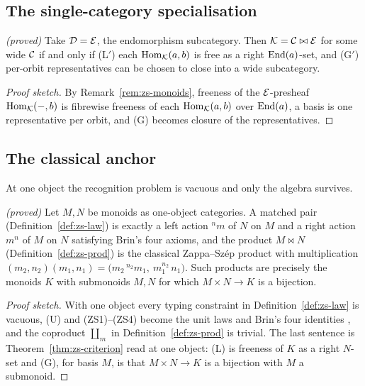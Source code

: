 \subsection*{The single-category specialisation}\label{sec:zs-single}

\begin{corollary}\label{cor:zs-single}
\emph{(proved)}\;
Take $\mathcal{D}=\mathcal{E}$, the endomorphism subcategory. Then $\mathcal{K}=\mathcal{C}\bowtie\mathcal{E}$ for some wide
$\mathcal{C}$ if and only if \textnormal{(L$'$)} each $\mathrm{Hom}_{\mathcal{K}}(a,b)$ is free as a right
$\mathrm{End}(a)$-set, and \textnormal{(G$'$)} per-orbit representatives can be chosen to
close into a wide subcategory.
\end{corollary}

\begin{proof}[Proof sketch]
By Remark~\ref{rem:zs-monoids}, freeness of the $\mathcal{E}$-presheaf $\mathrm{Hom}_{\mathcal{K}}(-,b)$ is
fibrewise freeness of each $\mathrm{Hom}_{\mathcal{K}}(a,b)$ over $\mathrm{End}(a)$, a basis is one
representative per orbit, and (G) becomes closure of the representatives.
\end{proof}

\subsection*{The classical anchor}\label{sec:zs-monoid}

At one object the recognition problem is vacuous and only the algebra survives.

\begin{proposition}\label{prop:zs-monoid}
\emph{(proved)}\;
Let $M,N$ be monoids as one-object categories. A matched pair
(Definition~\ref{def:zs-law}) is exactly a left action ${}^{n}m$ of $N$ on $M$ and
a right action $m^{n}$ of $M$ on $N$ satisfying Brin's four axioms, and the product
$M\bowtie N$ (Definition~\ref{def:zs-prod}) is the classical Zappa--Sz\'ep product
with multiplication $(m_2,n_2)(m_1,n_1)=\bigl(m_2\,{}^{n_2}m_1,\ m_1^{n_2}\,n_1
\bigr)$. Such products are precisely the monoids $K$ with submonoids $M,N$ for which
$M\times N\to K$ is a bijection.
\end{proposition}

\begin{proof}[Proof sketch]
With one object every typing constraint in Definition~\ref{def:zs-law} is vacuous,
(U) and (ZS1)--(ZS4) become the unit laws and Brin's four identities \cite{brin},
and the coproduct $\coprod_m$ in Definition~\ref{def:zs-prod} is trivial. The last
sentence is Theorem~\ref{thm:zs-criterion} read at one object: (L) is freeness of
$K$ as a right $N$-set and (G), for basis $M$, is that $M\times N\to K$ is a
bijection with $M$ a submonoid.
\end{proof}


